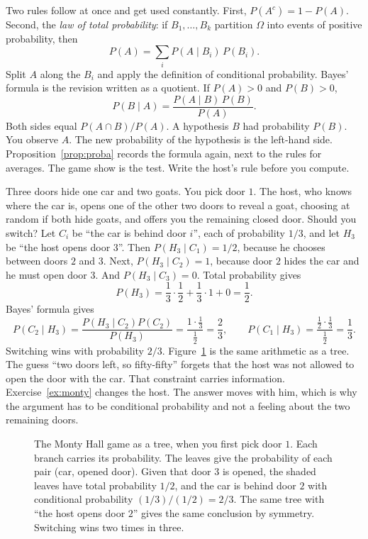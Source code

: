 Two rules follow at once and get used constantly. First, $P(A^c)=1-P(A)$. Second, the \emph{law of total probability}: if $B_1,\ldots,B_k$ partition $\Omega$ into events of positive probability, then
\[
 P(A)=\sum_i P(A\mid B_i)\,P(B_i).
\]
Split $A$ along the $B_i$ and apply the definition of conditional probability. Bayes' formula is the revision written as a quotient. If $P(A)>0$ and $P(B)>0$,
\[
 P(B\mid A)=\frac{P(A\mid B)\,P(B)}{P(A)}.
\]
Both sides equal $P(A\cap B)/P(A)$. A hypothesis $B$ had probability $P(B)$. You observe $A$. The new probability of the hypothesis is the left-hand side. Proposition~\ref{prop:proba} records the formula again, next to the rules for averages. The game show is the test. Write the host's rule before you compute.

\begin{examplex}
Three doors hide one car and two goats. You pick door $1$. The host, who knows where the car is, opens one of the other two doors to reveal a goat, choosing at random if both hide goats, and offers you the remaining closed door. Should you switch? Let $C_i$ be ``the car is behind door $i$'', each of probability $1/3$, and let $H_3$ be ``the host opens door $3$''. Then $P(H_3\mid C_1)=1/2$, because he chooses between doors $2$ and $3$. Next, $P(H_3\mid C_2)=1$, because door $2$ hides the car and he must open door $3$. And $P(H_3\mid C_3)=0$. Total probability gives
\[
 P(H_3)=\frac13\cdot\frac12+\frac13\cdot1+0=\frac12.
\]
Bayes' formula gives
\[
P(C_2\mid H_3)=\frac{P(H_3\mid C_2)P(C_2)}{P(H_3)}=\frac{1\cdot\frac13}{\frac12}=\frac23,
\qquad
P(C_1\mid H_3)=\frac{\frac12\cdot\frac13}{\frac12}=\frac13.
\]
Switching wins with probability $2/3$. Figure~\ref{fig:monty} is the same arithmetic as a tree. The guess ``two doors left, so fifty-fifty'' forgets that the host was not allowed to open the door with the car. That constraint carries information. Exercise~\ref{ex:monty} changes the host. The answer moves with him, which is why the argument has to be conditional probability and not a feeling about the two remaining doors.
\end{examplex}

\begin{figure}[ht]
\centering
{}
\caption{The Monty Hall game as a tree, when you first pick door $1$. Each branch carries its probability. The leaves give the probability of each pair (car, opened door). Given that door $3$ is opened, the shaded leaves have total probability $1/2$, and the car is behind door $2$ with conditional probability $(1/3)/(1/2)=2/3$. The same tree with ``the host opens door $2$'' gives the same conclusion by symmetry. Switching wins two times in three.}
\label{fig:monty}
\end{figure}

